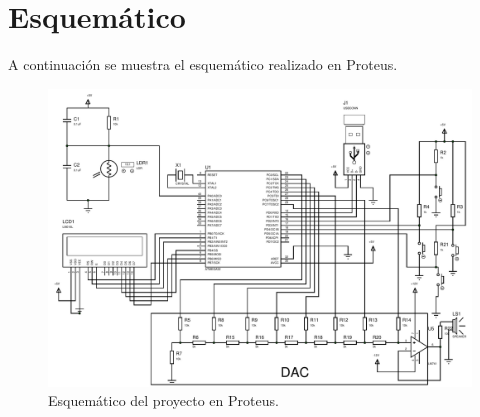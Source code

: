 \section{Esquemático}
\label{sec:esquematico}
A continuación se muestra el esquemático realizado en Proteus.

\begin{figure}[H]
  \centering
  \includegraphics[width=1.0\textwidth]{images/ProyectoLaboratorioMicroprocesadores.PDF}
  \caption{Esquemático del proyecto en Proteus.}
  \label{fig:Esquemático}
\end{figure}